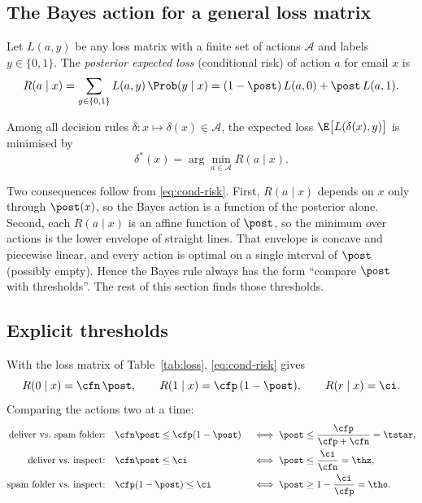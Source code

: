 \subsection{The Bayes action for a general loss matrix}
\label{sec:bayes-action}

Let $L(a,y)$ be any loss matrix with a finite set of actions $\mathcal A$ and labels $y\in\{0,1\}$.
The \emph{posterior expected loss} (conditional risk) of action $a$ for email $x$ is
\begin{equation}
  R(a\mid x) = \sum_{y\in\{0,1\}} L(a,y)\,\Prob(y\mid x) = (1-\post)\,L(a,0) + \post\,L(a,1).
  \label{eq:cond-risk}
\end{equation}

\begin{proposition}\label{prop:bayes}
Among all decision rules $\delta:x\mapsto\delta(x)\in\mathcal A$, the expected loss
$\E\big[L(\delta(x),y)\big]$ is minimised by
\[
  \delta^\ast(x) = \arg\min_{a\in\mathcal A} R(a\mid x).
\]
\end{proposition}

Two consequences follow from \eqref{eq:cond-risk}. First, $R(a\mid x)$ depends on $x$ only through
$\post(x)$, so the Bayes action is a function of the posterior alone. Second, each $R(a\mid x)$ is an
affine function of $\post$, so the minimum over actions is the lower envelope of straight lines.
That envelope is concave and piecewise linear, and every action is optimal on a single interval of
$\post$ (possibly empty). Hence the Bayes rule always has the form ``compare $\post$ with thresholds''.
The rest of this section finds those thresholds.

\subsection{Explicit thresholds}
\label{sec:thresholds}

With the loss matrix of Table~\ref{tab:loss}, \eqref{eq:cond-risk} gives
\begin{equation}
  R(0\mid x) = \cfn\,\post, \qquad R(1\mid x) = \cfp\,(1-\post), \qquad R(r\mid x) = \ci .
  \label{eq:three-risks}
\end{equation}
Comparing the actions two at a time:
\begin{align*}
  \text{deliver vs.\ spam folder:}\quad & \cfn\post \le \cfp(1-\post) &&\iff \post \le \frac{\cfp}{\cfp+\cfn} = \tstar, \\
  \text{deliver vs.\ inspect:}\quad     & \cfn\post \le \ci           &&\iff \post \le \frac{\ci}{\cfn} = \thz, \\
  \text{spam folder vs.\ inspect:}\quad & \cfp(1-\post) \le \ci       &&\iff \post \ge 1-\frac{\ci}{\cfp} = \tho .
\end{align*}

